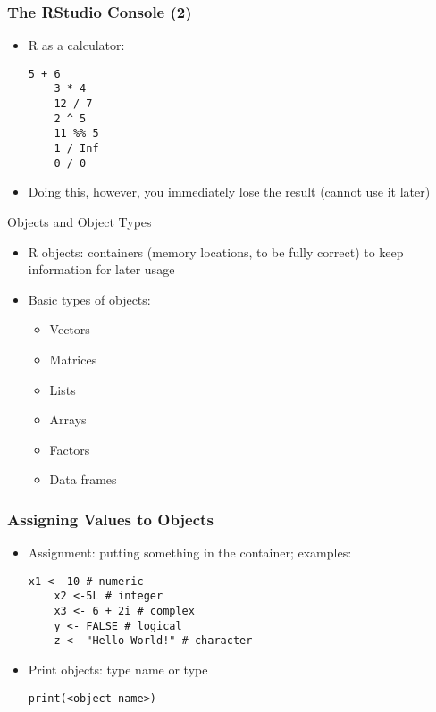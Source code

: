 \documentclass[10pt]{beamer}
\theoremstyle{definition}
\begin{document}
\begin{frame}[fragile]
\frametitle{The RStudio Console (2)}
\begin{itemize}
	\item R as a calculator:
	\begin{lstlisting}[style = rstyle, breaklines]
	5 + 6
	3 * 4
	12 / 7
	2 ^ 5
	11 %% 5
	1 / Inf
	0 / 0
	\end{lstlisting}

	\item Doing this, however, you immediately lose the result (cannot use it later)
\end{itemize}
\end{frame}

\begin{frame}{Objects and Object Types}
\begin{itemize}
	\item R objects: containers (memory locations, to be fully correct) to keep information for later usage
	
	\item Basic types of objects:
	\begin{itemize}
		\item Vectors
		
		\item Matrices

		\item Lists

		\item Arrays
		
		\item Factors
		
		\item Data frames
	\end{itemize}
\end{itemize}
\end{frame}

\begin{frame}[fragile]
\frametitle{Assigning Values to Objects}
\begin{itemize}
	\item Assignment: putting something in the container; examples:
	\begin{lstlisting}[style = rstyle, breaklines]
	x1 <- 10 # numeric
	x2 <-5L # integer
	x3 <- 6 + 2i # complex
	y <- FALSE # logical
	z <- "Hello World!" # character
	\end{lstlisting}

	\item Print objects: type name or type
	\begin{lstlisting}[style = rstyle, breaklines]
	print(<object name>)
	\end{lstlisting}
\end{itemize}
\end{frame}
\end{document}
